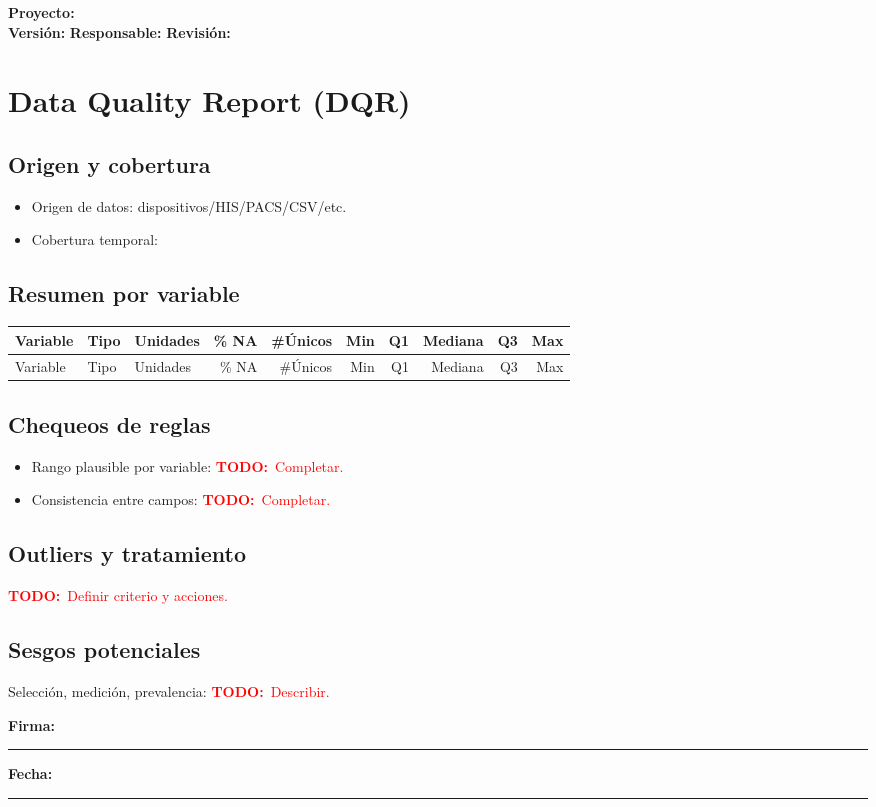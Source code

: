 \documentclass[11pt]{article}
\newcommand{\project}{\textbf{Proyecto:} \underline{\hspace{7cm}}}
\newcommand{\version}{\textbf{Versi\'on:} \underline{\hspace{3cm}}}
\newcommand{\owner}{\textbf{Responsable:} \underline{\hspace{5cm}}}
\newcommand{\review}{\textbf{Revisi\'on:} \underline{\hspace{3cm}}}
\newcommand{\signatureline}{\vspace{0.5cm}\noindent\textbf{Firma:}\ \rule{6cm}{0.4pt} \hfill \textbf{Fecha:}\ \rule{3cm}{0.4pt}}
\newcommand{\todo}[1]{\textcolor{red}{\textbf{TODO:}~#1}}
\begin{document}
\begin{flushright}
\project \\ \version \hspace{1cm} \owner \hspace{1cm} \review
\end{flushright}


\section*{Data Quality Report (DQR)}
\subsection*{Origen y cobertura}
\begin{itemize}
  \item Origen de datos: dispositivos/HIS/PACS/CSV/etc.
  \item Cobertura temporal: \underline{\hspace{6cm}}
\end{itemize}

\subsection*{Resumen por variable}
\begin{longtable}{@{}l l l r r r r r r r@{}}
\toprule
Variable & Tipo & Unidades & \% NA & \#\'Unicos & Min & Q1 & Mediana & Q3 & Max \\
\midrule
\endfirsthead
\toprule
Variable & Tipo & Unidades & \% NA & \#\'Unicos & Min & Q1 & Mediana & Q3 & Max \\
\midrule
\endhead
\bottomrule
\end{longtable}

\subsection*{Chequeos de reglas}
\begin{itemize}
  \item Rango plausible por variable: \todo{Completar.}
  \item Consistencia entre campos: \todo{Completar.}
\end{itemize}

\subsection*{Outliers y tratamiento}
\todo{Definir criterio y acciones.}

\subsection*{Sesgos potenciales}
Selecci\'on, medici\'on, prevalencia: \todo{Describir.}

\signatureline

\label{LastPage}
\end{document}
